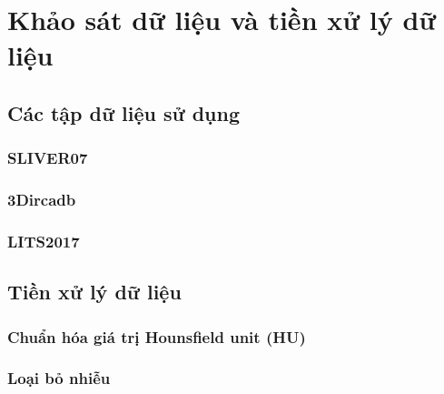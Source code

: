 \chapter{Khảo sát dữ liệu và tiền xử lý dữ liệu}
\section{Các tập dữ liệu sử dụng}
\subsection{SLIVER07}
\subsection{3Dircadb}
\subsection{LITS2017}
\section{Tiền xử lý dữ liệu}
\subsection{Chuẩn hóa giá trị Hounsfield unit (HU)}
\subsection{Loại bỏ nhiễu}

